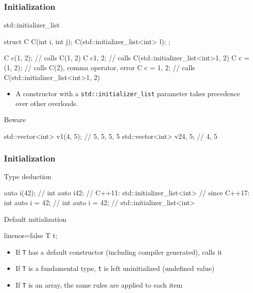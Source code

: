 \begin{frame}[fragile,shrink=10]
  \frametitle{Initialization}
  \begin{block}{std::initializer\_list}
    \begin{cppcode}
      struct C {
        C(int i, int j);
        C(std::initializer_list<int> l);
      };

      C c(1, 2);    // calls C(1, 2)
      C c{1, 2};    // calls C(std::initializer_list<int>{1, 2})
      C c = (1, 2); // calls C(2), comma operator, error
      C c = {1, 2}; // calls C(std::initializer_list<int>{1, 2})
    \end{cppcode}
    \begin{itemize}
      \item A constructor with a \texttt{std::initializer_list} parameter takes precedence over other overloads.
    \end{itemize}
  \end{block}
  \begin{alertblock}{Beware}
    \begin{cppcode}
      std::vector<int> v1(4, 5); // {5, 5, 5, 5}
      std::vector<int> v2{4, 5}; // {4, 5}
    \end{cppcode}
  \end{alertblock}
\end{frame}

\begin{frame}[fragile]
  \frametitle{Initialization}
  \begin{block}{Type deduction}
    \begin{cppcode}
      auto i(42);    // int
      auto i{42};    // C++11: std::initializer_list<int>
                     // since C++17: int
      auto i = 42;   // int
      auto i = {42}; // std::initializer_list<int>
    \end{cppcode}
  \end{block}
\end{frame}

\begin{frame}[fragile]
  \begin{block}{Default initialization}
    \begin{cppcode*}{linenos=false}
      T t;
    \end{cppcode*}
    \begin{itemize}
      \item If \texttt{T} has a default constructor (including compiler generated), calls it
      \item If \texttt{T} is a fundamental type, \texttt{t} is left uninitialized (undefined value)
      \item If \texttt{T} is an array, the same rules are applied to each item
    \end{itemize}
  \end{block}
\end{frame}

